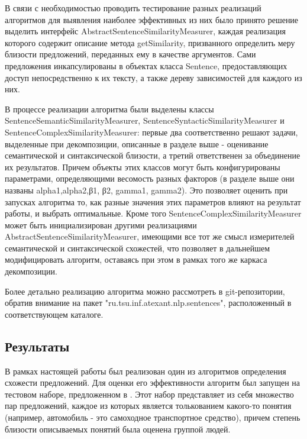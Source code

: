 

В связи с необходимостью проводить тестирование разных реализаций алгоритмов
для выявления наиболее эффективных из них было принято решение выделить интерфейс
AbstractSentenceSimilarityMeasurer, каждая реализация которого содержит описание метода getSimilarity,
призванного определить меру близости предложений, переданных ему в качестве аргументов.
Сами предложения инкапсулированы в объектах класса Sentence, предоставляющих доступ
непосредственно к их тексту, а также дереву зависимостей для каждого из них.


В процессе реализации алгоритма были выделены классы SentenceSemanticSimilarityMeasurer,
SentenceSyntacticSimilarityMeasurer и SentenceComplexSimilarityMeasurer:
первые два соответственно решают задачи, выделенные при декомпозиции, описанные
в разделе выше - оценивание семантической и синтаксической близости,
а третий ответственен за объединение их результатов. Причем объекты этих классов
могут быть конфигурированы параметрами, определяющими весомость разных факторов
(в разделе выше они названы alpha1,alpha2,β1, β2, gamma1, gamma2).
Это позволяет оценить при запусках алгоритма то, как разные значения этих параметров влияют на результат работы,
и выбрать оптимальные. Кроме того SentenceComplexSimilarityMeasurer может быть инициализирован 
другими реализациями AbstractSentenceSimilarityMeasurer, имеющими все тот же смысл
измерителей семантической и синтаксической схожестей, что позволяет в дальнейшем модифицировать алгоритм,
оставаясь при этом в рамках того же каркаса декомпозиции. 

Более детально реализацию алгоритма можно рассмотреть в git-репозитории\cite{github},
обратив внимание на пакет "ru.tsu.inf.atexant.nlp.sentences",
расположенный в соответствующем каталоге.

\subsection{Результаты}
В рамках настоящей работы был реализован один из алгоритмов определения схожести предложений.
Для оценки его эффективности алгоритм был запущен на тестовом наборе,
предложенном в \cite{complexSim}. Этот набор представляет из себя множество пар предложений,
каждое из которых является толькованием какого-то понятия (например, автомобиль - это самоходное транспортное средство),
причем степень близости описываемых понятий была оценена группой людей.

